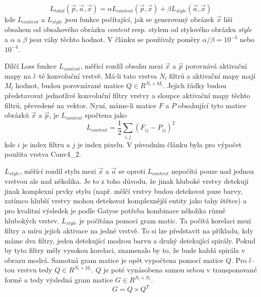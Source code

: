 \documentclass[twocolumn]{article}
\begin{document}
	\begin{equation*}
		L_{total}(\overrightarrow{p}, \overrightarrow{a}, \overrightarrow{x}) = \alpha L_{content}(\overrightarrow{p}, \overrightarrow{x}) + \beta L_{style} (\overrightarrow{a}, \overrightarrow{x})
	\end{equation*}
	kde $L_{content}$ a $L_{style}$ jsou funkce počítající, jak se generovaný obrázek $\overrightarrow{x}$ liší obsahem od obsahového obrázku \textit{content} resp. stylem od stylového obrázku \textit{style} a $\alpha$ a $\beta$ jsou váhy těchto hodnot. V článku se používaly poměry $\alpha / \beta = 10^{-3}$ nebo $10^{-4}$.
	\par
	Dílčí Loss funkce $L_{content}$, měřící rozdíl obsahu mezi  $\overrightarrow{x}$ a  $\overrightarrow{p}$ porovnává aktivační mapy na $l$--té konvoluční vrstvě. Má-li tato vrstva $N_l$ filtrů a aktivační mapy mají $M_l$ hodnot, budou porovnávané matice $Q \in R^{N_l \times M_l}$. Jejich řádky budou představovat jednotlivé konvoluční filtry vrstvy a sloupce aktivační mapy těchto filtrů, převedené na vektor. Nyní, máme-li matice $F$ a $P$ obsahující tyto matice obrázků $\overrightarrow{x}$ a  $\overrightarrow{p}$, je $L_{content}$ spočtena jako
		\begin{equation*}
		L_{content} = \dfrac{1}{2} \sum_{i,j} (F_{ij} - P_{ij})^2
	\end{equation*}
	kde $i$ je index filtru a $j$ je index pixelu. V původním článku byla pro výpočet použita vrstva Conv4\_2.
	\par
	$L_{style}$, měřící rozdíl stylu mezi  $\overrightarrow{x}$ a  $\overrightarrow{a}$ se oproti $L_{content}$ nepočítá pouze nad jednou vrstvou ale nad několika. Je to z toho důvodu, že jinak hluboké vrstvy detekují jinak komplexní prvky stylu (např. mělčí vrstvy budou detekovat puze barvy, zatímco hlubší vrstvy mohou detekovat komplexnější entity jako tahy štětce) a pro kvalitní výsledek je podle Gatyse potřeba kombinace několika různě hlubokých vrstev. $L_{style}$ je počítána pomocí gram matic. Ta počítá korelaci mezi filtry a míru jejich aktivace na jedné vrstvě. To si lze představit na příkladu, kdy máme dva filtry, jeden detekující modrou barvu a druhý detekující spirály. Pokud by tyto filtry měly vysokou korelaci, znamenalo by to, že bude každá spirála v obrazu modrá. Samotná gram matice je opět vypočtena pomocí matice $Q$. Pro $l$--tou vrstvu tedy $Q \in R^{N_l \times M_l}$. $Q$ je poté vynásobena samou sebou v transponované formě a tedy výsledná gram matice $G \in R^{ N_l \times N_l}$.
	\begin{equation*}
		G = Q \times Q^T
	\end{equation*}
\end{document}
